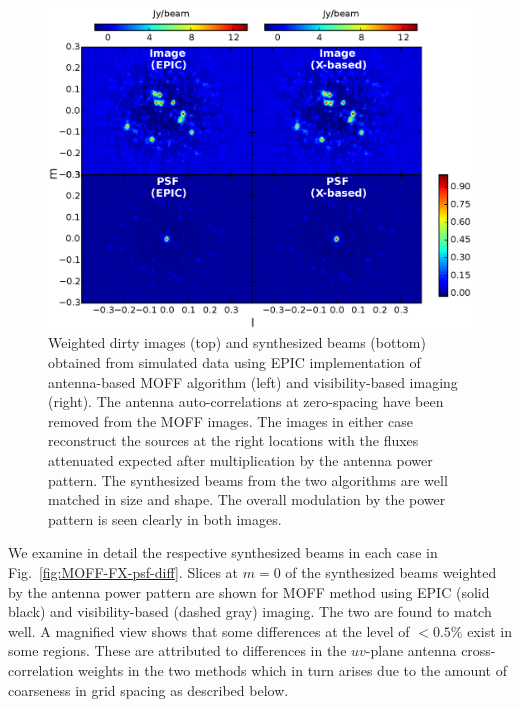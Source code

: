 \documentclass[a4paper,fleqn,usenatbib]{mnras}
\begin{document}
\begin{figure}
  \includegraphics[width=\columnwidth]{figure5}
  \caption{Weighted dirty images (top) and synthesized beams (bottom) obtained from simulated data using EPIC implementation of antenna-based MOFF algorithm (left) and visibility-based imaging (right). The antenna auto-correlations at zero-spacing have been removed from the MOFF images. The images in either case reconstruct the sources at the right locations with the fluxes attenuated expected after multiplication by the antenna power pattern. 
    The synthesized beams from the two algorithms are well matched in size and
    shape. The overall modulation by the power pattern is seen clearly in both
    images.}
  \label{fig:MOFF-FX-image}
\end{figure}

We examine in detail the respective synthesized beams in each case in Fig.~\ref{fig:MOFF-FX-psf-diff}. Slices at $m=0$ of the synthesized beams weighted by the antenna power pattern are shown for MOFF method using EPIC (solid black) and visibility-based (dashed gray) imaging. The two are found to match well. A magnified view shows that some differences at the level of $<0.5$\% exist in some regions. These are attributed to differences in the $uv$-plane antenna cross-correlation weights in the two methods which in turn arises due to the amount of coarseness in grid spacing as described below.
\end{document}
